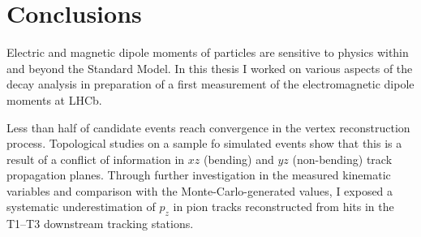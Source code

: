 \chapter*{Conclusions}

Electric and magnetic dipole moments of particles are sensitive to physics within and beyond the Standard Model.
In this thesis I worked on various aspects of the \demonstratorshort decay analysis in preparation of a first measurement of the \lz electromagnetic dipole moments at LHCb.


Less than half of candidate \lambdadecay events reach convergence in the vertex reconstruction process.
Topological studies on a sample fo simulated events show that this is a result of a conflict of information in $xz$ (bending) and $yz$ (non-bending) track propagation planes.
Through further investigation in the measured kinematic variables and comparison with the Monte-Carlo-generated values, I exposed a systematic underestimation of $p_z$ in pion tracks reconstructed from hits in the T1--T3 downstream tracking stations.

